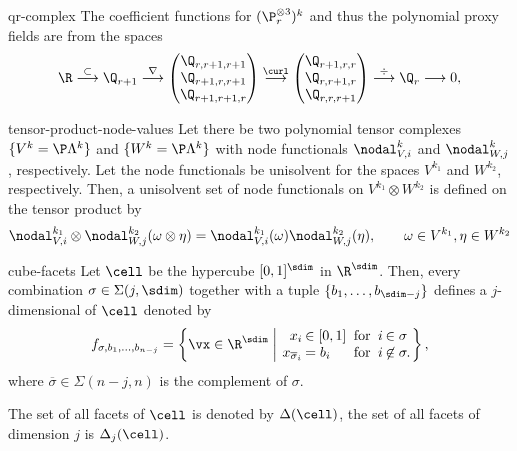 \begin{Lemma}{qr-complex}
  The coefficient functions for $(\P_r^{\otimes 3})^k$ and thus the
  polynomial proxy fields are from the spaces
  \begin{gather}
    \R
    \overset{\subset}{\longrightarrow} \Q_{r+1}
    \overset{\nabla}{\longrightarrow}
    \begin{pmatrix}
      \Q_{r,r+1,r+1}\\\Q_{r+1,r,r+1}\\\Q_{r+1,r+1,r}
    \end{pmatrix}
    \overset{\curl}{\longrightarrow}
    \begin{pmatrix}
      \Q_{r+1,r,r}\\\Q_{r,r+1,r}\\\Q_{r,r,r+1}
    \end{pmatrix}
    \overset{\div}{\longrightarrow}
    \Q_r
    \longrightarrow 0,    
  \end{gather}
\end{Lemma}


\begin{Theorem}{tensor-product-node-values}
  Let there be two polynomial tensor complexes $\{V^k=\P\Lambda^k\}$
  and $\{W^k=\P\Lambda^k\}$ with node functionals $\nodal_{V,i}^k$ and
  $\nodal_{W,j}^k$, respectively. Let the node functionals be
  unisolvent for the spaces $V^{k_1}$ and $W^{k_2}$,
  respectively. Then, a unisolvent set of node functionals on
  $V^{k_1}\otimes W^{k_2}$ is defined on the tensor product by
  \begin{gather}
    \nodal_{V,i}^{k_1}\otimes\nodal_{W,j}^{k_2}(\omega\otimes\eta)
    = \nodal_{V,i}^{k_1}(\omega)\nodal_{W,j}^{k_2}(\eta),
    \qquad \omega\in V^{k_1}, \eta\in W^{k_2}
  \end{gather}
\end{Theorem}

\begin{Definition}{cube-facets}
  Let $\cell$ be the hypercube $[0,1]^\sdim$ in $\R^\sdim$. Then,
  every combination $\sigma\in\Sigma(j,\sdim)$ together with a tuple
  $\{b_1,\dots,b_{\sdim-j}\}$ defines a $j$-dimensional  of $\cell$ denoted by
  \begin{gather}
    f_{\sigma,b_1,\dots,b_{n-j}} =
    \left\{
      \vx\in\R^\sdim \;\middle\vert\;
      \arraycolsep1pt
      \begin{array}{rlcrl}
        x_i &\in [0,1] &\text{ for }& i&\in\sigma\\
        x_{\overline\sigma_i} &= b_i&\text{ for }& i&\not\in\sigma.
      \end{array}
    \right\},
  \end{gather}
  where $\overline\sigma\in\Sigma(n-j,n)$ is the complement of $\sigma$.

  The set of all facets of $\cell$ is denoted by $\Delta(\cell)$, the
  set of all facets of dimension $j$ is $\Delta_j(\cell)$.
\end{Definition}

